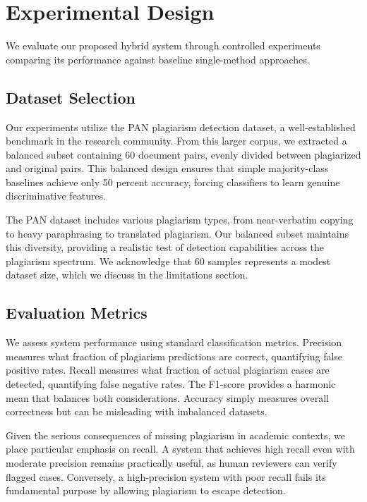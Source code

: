 \documentclass[conference]{IEEEtran}
\begin{document}
\section{Experimental Design}

We evaluate our proposed hybrid system through controlled experiments comparing its performance against baseline single-method approaches.

\subsection{Dataset Selection}

Our experiments utilize the PAN plagiarism detection dataset, a well-established benchmark in the research community. From this larger corpus, we extracted a balanced subset containing 60 document pairs, evenly divided between plagiarized and original pairs. This balanced design ensures that simple majority-class baselines achieve only 50 percent accuracy, forcing classifiers to learn genuine discriminative features.

The PAN dataset includes various plagiarism types, from near-verbatim copying to heavy paraphrasing to translated plagiarism. Our balanced subset maintains this diversity, providing a realistic test of detection capabilities across the plagiarism spectrum. We acknowledge that 60 samples represents a modest dataset size, which we discuss in the limitations section.

\subsection{Evaluation Metrics}

We assess system performance using standard classification metrics. Precision measures what fraction of plagiarism predictions are correct, quantifying false positive rates. Recall measures what fraction of actual plagiarism cases are detected, quantifying false negative rates. The F1-score provides a harmonic mean that balances both considerations. Accuracy simply measures overall correctness but can be misleading with imbalanced datasets.

Given the serious consequences of missing plagiarism in academic contexts, we place particular emphasis on recall. A system that achieves high recall even with moderate precision remains practically useful, as human reviewers can verify flagged cases. Conversely, a high-precision system with poor recall fails its fundamental purpose by allowing plagiarism to escape detection.
\end{document}
